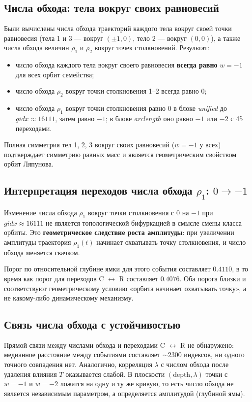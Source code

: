\subsection{Числа обхода: тела вокруг своих равновесий}
Были вычислены числа обхода траекторий каждого тела вокруг своей точки равновесия (тела 1 и 3 — вокруг \((\pm 1, 0)\), тело 2 — вокруг \((0,0)\)), а также числа обхода величин \(\rho_1\) и \(\rho_2\) вокруг точек столкновений. Результат:
\begin{itemize}
    \item число обхода каждого тела вокруг своего равновесия \textbf{всегда равно} \(w = -1\) для всех орбит семейства;
    \item число обхода \(\rho_2\) вокруг точки столкновения 1–2 всегда равно \(0\);
    \item число обхода \(\rho_1\) вокруг точки столкновения равно \(0\) в блоке \textit{unified} до \(gidx \approx 16111\), затем равно \(-1\); в блоке \textit{arclength} оно равно \(-1\) или \(-2\) с 45 переходами.
\end{itemize}
Полная симметрия тел 1, 2, 3 вокруг своих равновесий (\(w=-1\) у всех) подтверждает симметрию равных масс и является геометрическим свойством орбит Ляпунова.

\subsection{Интерпретация переходов числа обхода \(\rho_1\): \(0 \to -1\)}
Изменение числа обхода \(\rho_1\) вокруг точки столкновения с \(0\) на \(-1\) при \(gidx \approx 16111\) не является топологической бифуркацией в смысле смены класса орбиты. Это \textbf{геометрическое следствие роста амплитуды}: при увеличении амплитуды траектория \(\rho_1(t)\) начинает охватывать точку столкновения, и число обхода меняется скачком.

Порог по относительной глубине ямки для этого события составляет \(0.4110\), в то время как порог для переходов C \(\leftrightarrow\) R составляет \(0.4076\). Оба порога близки и соответствуют геометрическому условию «орбита начинает охватывать точку», а не какому-либо динамическому механизму.

\subsection{Связь числа обхода с устойчивостью}
Прямой связи между числами обхода и переходами C \(\leftrightarrow\) R не обнаружено: медианное расстояние между событиями составляет \(\sim 2300\) индексов, ни одного точного совпадения нет. Аналогично, корреляция \(\lambda\) с числом обхода после удаления влияния \(T\) оказывается слабой. В плоскости \((\text{depth}, \lambda)\) точки с \(w=-1\) и \(w=-2\) ложатся на одну и ту же кривую, то есть число обхода не является независимым параметром, а определяется амплитудой (глубиной ямы).

